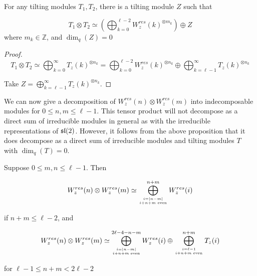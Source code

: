 \begin{corollary}
\label{theorem:tensortilting}
    For any tilting modules $T_1, T_2$, there is a tilting module $Z$ such that 

    \begin{equation}
            T_1 \otimes T_2 \simeq \left(\bigoplus_{k=0}^{\ell - 2} W_z^{res}(k)^{\otimes m_k}\right) \oplus Z
    \end{equation}
    where $m_k \in \mathbb{Z}$, and $\dim_q(Z) = 0$
\end{corollary}
\begin{proof}
\begin{equation}
    T_1 \otimes T_2 \simeq \bigoplus_{k=0}^{\infty} T_z(k)^{\otimes n_k} =
    \bigoplus_{k=0}^{\ell-2} W_z^{res}(k)^{\otimes n_k} \oplus
    \bigoplus_{k=\ell-1}^{\infty} T_z(k)^{\otimes n_k}
\end{equation}

Take $Z = \displaystyle\bigoplus_{k=\ell-1}^{\infty} T_z(k)^{\otimes n_k}$.
\end{proof}

We can now give a decomposition of $W_z^{res}(n) \otimes W_z^{res}(m)$ into
indecomposable modules for $0 \leq n,m \leq \ell-1$.  This tensor product will
not decompose as a direct sum of irreducible modules in general as with the
irreducible representations of $\mathfrak{sl}(2)$. However, it follows from the above
proposition that it does decompose as a direct sum of irreducible modules and
tilting modules $T$ with $\dim_q(T) = 0$.

\begin{prop}
\label{theorem:decomposition}
Suppose $0 \leq m,n \leq \ell - 1$. Then

\begin{equation}
W_z^{res}(n) \otimes W_{z}^{res}(m) \simeq \bigoplus_{i=|n-m| \atop i + n + m \text{ even}}^{n+m} W_z^{res}(i) 
\end{equation}

if $n+m \leq \ell - 2$, and 

\begin{equation}
W_z^{res}(n) \otimes W_{z}^{res}(m) \simeq \bigoplus_{i=|n-m| \atop i + n + m \text{ even}}^{2\ell - 4 - n - m} W_z^{res}(i) 
                                    \oplus \bigoplus_{i = \ell - 1 \atop i + n + m \text{ even}} ^{n + m} T_z(i)
\end{equation}

for $\ell - 1 \leq n + m < 2\ell - 2$
\end{prop}


